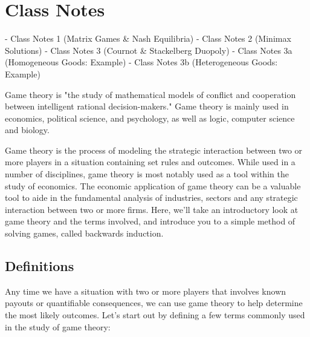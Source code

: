 

\section{Class Notes}

- Class Notes 1 (Matrix Games & Nash Equilibria)
- Class Notes 2 (Minimax Solutions)
- Class Notes 3 (Cournot & Stackelberg Duopoly)
- Class Notes 3a (Homogeneous Goods: Example)
- Class Notes 3b (Heterogeneous Goods: Example)





Game theory is "the study of mathematical models of conflict and cooperation between intelligent rational decision-makers." Game theory is mainly used in economics, political science, and psychology, as well as logic, computer science and biology.



Game theory is the process of modeling the strategic interaction between two or more players in a situation containing set rules and outcomes. While used in a number of disciplines, game theory is most notably used as a tool within the study of economics. The economic application of game theory can be a valuable tool to aide in the fundamental analysis of industries, sectors and any strategic interaction between two or more firms. Here, we'll take an introductory look at game theory and the terms involved, and introduce you to a simple method of solving games, called backwards induction.

\subsection{Definitions} 
Any time we have a situation with two or more players that involves known payouts or quantifiable consequences, we can use game theory to help determine the most likely outcomes. 
Let's start out by defining a few terms commonly used in the study of game theory:

